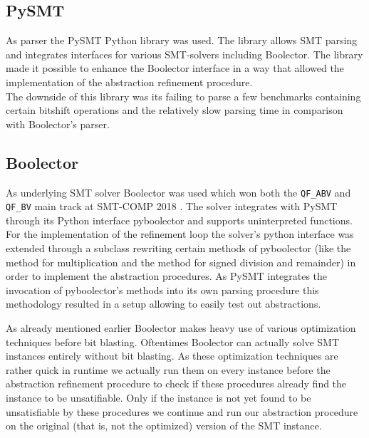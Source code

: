 \subsection{PySMT}
\label{sec:implementation:pysmt}
As parser the PySMT Python library \cite{pysmt2015} was used. The library allows
SMT parsing and integrates interfaces for various SMT-solvers including Boolector.
The library made it possible to enhance the Boolector interface in a way that allowed the implementation
of the abstraction refinement procedure.\\
The downside of this library was its failing to parse a few benchmarks containing certain bitshift operations
and the relatively slow parsing time in comparison with Boolector's parser\footnotemark.

\subsection{Boolector}
\label{sec:implementation:boolector}
As underlying SMT solver Boolector \cite{Brummayer-Biere2009_Chapter_BoolectorAnEfficientSMTSolverF} was used
which won both the \texttt{QF\_ABV} and \texttt{QF\_BV} main track at SMT-COMP 2018 \cite{SMTCOMP18}.
The solver integrates with PySMT through its Python interface pyboolector and supports uninterpreted functions.
For the implementation of the refinement loop the solver's python interface was extended through a subclass rewriting certain methods of pyboolector
(like the method for multiplication and the method for signed division and remainder) in order to implement the abstraction procedures.
As PySMT integrates the invocation of pyboolector's methods into its own parsing procedure this methodology resulted in a setup allowing to
easily test out abstractions.
\par
As already mentioned earlier Boolector makes heavy use of various optimization techniques before bit blasting.
Oftentimes Boolector can actually solve SMT instances entirely without bit blasting.
As these optimization techniques are rather quick in runtime we actually run them on every instance before the abstraction refinement procedure to check if these
procedures already find the instance to be unsatifiable.
Only if the instance is not yet found to be unsatisfiable by these procedures we continue and run our abstraction procedure on the original (that is, not the optimized) version of the SMT instance.

